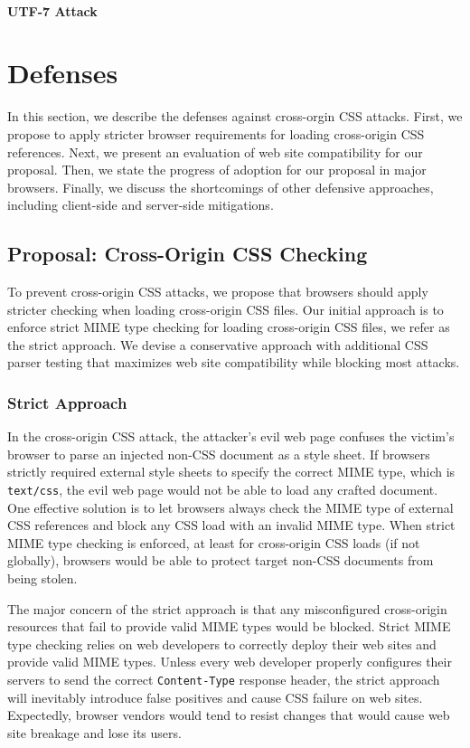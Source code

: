 \documentclass{acm_proc_article-sp}
\begin{document}
\paragraph{UTF-7 Attack}


\section{Defenses} \label{sec:defenses}
In this section, we describe the defenses against cross-orgin CSS attacks. First, we propose to apply stricter browser requirements for loading cross-origin CSS references. Next, we present an evaluation of web site compatibility for our proposal. Then, we state the progress of adoption for our proposal in major browsers. Finally, we discuss the shortcomings of other defensive approaches, including client-side and server-side mitigations.

\subsection{Proposal: Cross-Origin CSS Checking}
To prevent cross-origin CSS attacks, we propose that browsers should apply stricter checking when loading cross-origin CSS files. Our initial approach is to enforce strict MIME type checking for loading cross-origin CSS files, we refer as the strict approach. We devise a conservative approach with additional CSS parser testing that maximizes web site compatibility while blocking most attacks.

\subsubsection{Strict Approach}
In the cross-origin CSS attack, the attacker's evil web page confuses the victim's browser to parse an injected non-CSS document as a style sheet. If browsers strictly required external style sheets to specify the correct MIME type, which is \texttt{text/css}, the evil web page would not be able to load any crafted document. One effective solution is to let browsers always check the MIME type of external CSS references and block any CSS load with an invalid MIME type. When strict MIME type checking is enforced, at least for cross-origin CSS loads (if not globally), browsers would be able to protect target non-CSS documents from being stolen.

The major concern of the strict approach is that any misconfigured cross-origin resources that fail to provide valid MIME types would be blocked. Strict MIME type checking relies on web developers to correctly deploy their web sites and provide valid MIME types. Unless every web developer properly configures their servers to send the correct \texttt{Content-Type} response header, the strict approach will inevitably introduce false positives and cause CSS failure on web sites. Expectedly, browser vendors would tend to resist changes that would cause web site breakage and lose its users.
\end{document}
